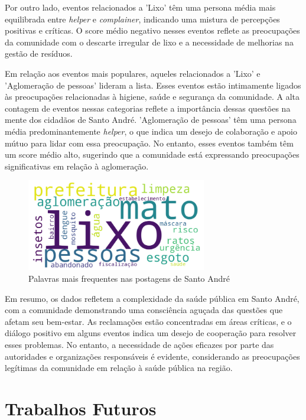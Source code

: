Por outro lado, eventos relacionados a 'Lixo' têm uma persona média mais equilibrada entre \textit{helper} e \textit{complainer}, indicando uma mistura de percepções positivas e críticas. O score médio negativo nesses eventos reflete as preocupações da comunidade com o descarte irregular de lixo e a necessidade de melhorias na gestão de resíduos.

Em relação aos eventos mais populares, aqueles relacionados a 'Lixo' e 'Aglomeração de pessoas' lideram a lista. Esses eventos estão intimamente ligados às preocupações relacionadas à higiene, saúde e segurança da comunidade. A alta contagem de eventos nessas categorias reflete a importância dessas questões na mente dos cidadãos de Santo André. 'Aglomeração de pessoas' têm uma persona média predominantemente \textit{helper}, o que indica um desejo de colaboração e apoio mútuo para lidar com essa preocupação. No entanto, esses eventos também têm um score médio alto, sugerindo que a comunidade está expressando preocupações significativas em relação à aglomeração.

\begin{figure}[htb]
	\centering
	\includegraphics[width=0.7\textwidth]{images/wordcloud_santo_andre.png}
	\caption{Palavras mais frequentes nas postagens de Santo André}
	\label{fig:wordcloud_santo_andre}
\end{figure}

Em resumo, os dados refletem a complexidade da saúde pública em Santo André, com a comunidade demonstrando uma consciência aguçada das questões que afetam seu bem-estar. As reclamações estão concentradas em áreas críticas, e o diálogo positivo em alguns eventos indica um desejo de cooperação para resolver esses problemas. No entanto, a necessidade de ações eficazes por parte das autoridades e organizações responsáveis é evidente, considerando as preocupações legítimas da comunidade em relação à saúde pública na região.

\section{Trabalhos Futuros}

